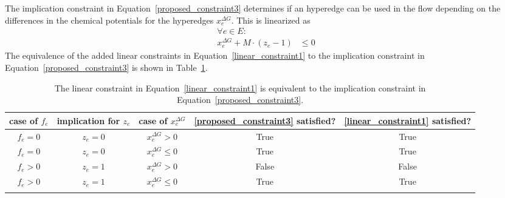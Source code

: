 The implication constraint in Equation~\eqref{proposed_constraint3} determines if an hyperedge can be used in the flow depending on the differences in the chemical potentials for the hyperedges $x^{\Delta G}_e$.
This is linearized as
\begin{align}
    \forall e \in E\colon & \nonumber \\
    x^{\Delta G}_e + M\cdot (z_e - 1) &\leq 0 \label{linear_constraint1}
\end{align}
The equivalence of the added linear constraints in Equation~\eqref{linear_constraint1} to the implication constraint in Equation~\eqref{proposed_constraint3} is shown in Table~\ref{tab: truth_table_constraint2}.
\begin{table}[!t]
    \centering
    \begin{footnotesize}
    \begin{tabular}{ccccc}
        \\\toprule
        case of $f_{e}$ & implication for $z_{e}$ & case of $x^{\Delta G}_e$ & \eqref{proposed_constraint3} satisfied? & \eqref{linear_constraint1} satisfied? \\
        \midrule
        $f_{e} = 0$ & $z_{e} = 0$ & $x^{\Delta G}_e > 0$ & True & True \\
        $f_{e} = 0$ & $z_{e} = 0$ & $x^{\Delta G}_e \leq 0$ & True & True \\
        $f_{e} > 0$ & $z_{e} = 1$ & $x^{\Delta G}_e > 0$ & False & False \\
        $f_{e} > 0$ & $z_{e} = 1$ & $x^{\Delta G}_e \leq 0$ & True & True \\
        \bottomrule\\
    \end{tabular}
    \end{footnotesize}
    \caption{The linear constraint in Equation~\eqref{linear_constraint1} is equivalent to the implication constraint in Equation~\eqref{proposed_constraint3}.}
    \label{tab: truth_table_constraint2}
\end{table}

